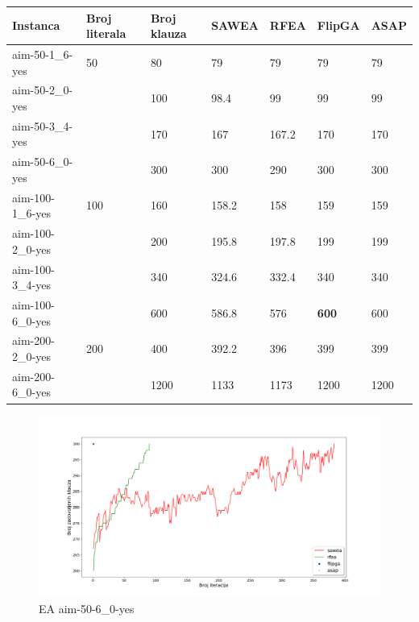 \documentclass[a4paper]{article}
\begin{document}
\begin{table}[h!]
\centering
{}\label{tab:ea_SAT} 
\begin{tabular}{ |p{2.5cm}|p{1.4cm}|p{1.4cm}||p{1.6cm}|p{1.6cm}|p{1.6cm}|p{1.6cm}|}
\hline
 Instanca & Broj \break literala & Broj \break klauza & SAWEA & RFEA & FlipGA & ASAP \\ 
 \hline
 aim-50-1\_6-yes & 50 & 80 & 79 & 79 & 79 &  79 \\ 
 aim-50-2\_0-yes &  & 100 &  98.4 &  99 & 99 & 99 \\ 
 aim-50-3\_4-yes &  & 170 & 167 & 167.2 & 170 & 170  \\ 
 aim-50-6\_0-yes &  & 300 &  300 & 290 &  300 &  300 \\ 
 \hline
 aim-100-1\_6-yes & 100 & 160 & 158.2 & 158 &  159 & 159 \\ 
 aim-100-2\_0-yes &  & 200 & 195.8 &  197.8 & 199 &  199 \\ 
 aim-100-3\_4-yes &  & 340 & 324.6  & 332.4 & 340 & 340 \\ 
 aim-100-6\_0-yes &  & 600 &  586.8 & 576 & \textbf{600} & 600 \\ 
 \hline
 aim-200-2\_0-yes & 200 & 400 &  392.2 & 396 & 399 & 399 \\ 
 aim-200-6\_0-yes &  & 1200 & 1133 & 1173 &  1200 & 1200 \\ 
 \hline
\end{tabular} 
\end{table}


\begin{figure}[h!]
\centering
\includegraphics[width=\textwidth]{ea-aim-50-6_0-yes}
\caption{EA aim-50-6\_0-yes}\label{img:ea_yes1}
\end{figure}
\end{document}
